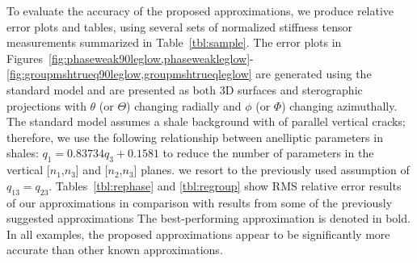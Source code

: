 To evaluate the accuracy of the proposed approximations, we produce relative error plots and tables, using several sets of normalized stiffness tensor measurements summarized in Table~\ref{tbl:sample}. The error plots in Figures~\ref{fig:phaseweak90leglow,phaseweakleglow}-\ref{fig:groupmshtrueq90leglow,groupmshtrueqleglow} are generated using the standard model \cite[]{helbig} and are presented as both 3D surfaces and sterographic projections with $\theta$ (or $\Theta$) changing radially and $\phi$ (or $\Phi$) changing azimuthally. The standard model assumes a shale background with  of parallel vertical cracks; therefore, we use the following relationship between anelliptic parameters in shales: $q_1 = 0.83734 q_3 +0.1581$ to reduce the number of parameters in the vertical [$n_1$,$n_3$] and [$n_2$,$n_3$] planes.  we resort to the previously used assumption of $q_{13}=q_{23}$. Tables~\ref{tbl:rephase} and \ref{tbl:regroup} show RMS relative error results of our approximations in comparison with results from some of the previously suggested approximations  The best-performing approximation is denoted in  bold. In all examples, the proposed approximations appear to be significantly more accurate than  other known approximations.

